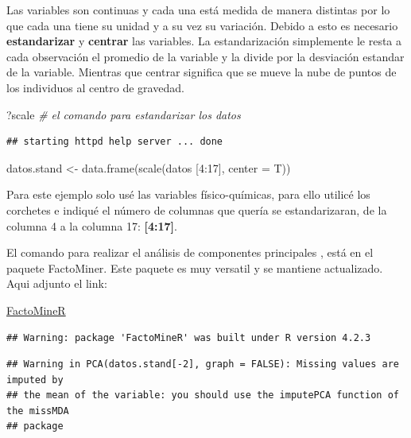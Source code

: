 \documentclass[
]{book}
\newenvironment{Shaded}{\begin{snugshade}}{\end{snugshade}}
\newcommand{\AttributeTok}[1]{\textcolor[rgb]{0.77,0.63,0.00}{#1}}
\newcommand{\CommentTok}[1]{\textcolor[rgb]{0.56,0.35,0.01}{\textit{#1}}}
\newcommand{\DecValTok}[1]{\textcolor[rgb]{0.00,0.00,0.81}{#1}}
\newcommand{\FunctionTok}[1]{\textcolor[rgb]{0.00,0.00,0.00}{#1}}
\newcommand{\NormalTok}[1]{#1}
\newcommand{\OtherTok}[1]{\textcolor[rgb]{0.56,0.35,0.01}{#1}}
\newcommand{\SpecialCharTok}[1]{\textcolor[rgb]{0.00,0.00,0.00}{#1}}
\begin{document}
Las variables son continuas y cada una está medida de manera distintas por lo que cada una tiene su unidad y a su vez su variación. Debido a esto es necesario \textbf{estandarizar} y \textbf{centrar} las variables. La estandarización simplemente le resta a cada observación el promedio de la variable y la divide por la desviación estandar de la variable. Mientras que centrar significa que se mueve la nube de puntos de los individuos al centro de gravedad.

\begin{Shaded}
\begin{Highlighting}[]
\NormalTok{?scale }\CommentTok{\# el comando para estandarizar los datos}
\end{Highlighting}
\end{Shaded}

\begin{verbatim}
## starting httpd help server ... done
\end{verbatim}

\begin{Shaded}
\begin{Highlighting}[]
\NormalTok{datos.stand }\OtherTok{\textless{}{-}} \FunctionTok{data.frame}\NormalTok{(}\FunctionTok{scale}\NormalTok{(datos [}\DecValTok{4}\SpecialCharTok{:}\DecValTok{17}\NormalTok{], }\AttributeTok{center =}\NormalTok{ T))}
\end{Highlighting}
\end{Shaded}

Para este ejemplo solo usé las variables físico-químicas, para ello utilicé los corchetes e indiqué el número de columnas que quería se estandarizaran, de la columna 4 a la columna 17: \textbf{{[}4:17{]}}.

El comando para realizar el análisis de componentes principales , está en el paquete FactoMiner. Este paquete es muy versatil y se mantiene actualizado. Aqui adjunto el link:

\href{http://factominer.free.fr}{FactoMineR}

\begin{verbatim}
## Warning: package 'FactoMineR' was built under R version 4.2.3
\end{verbatim}

\begin{verbatim}
## Warning in PCA(datos.stand[-2], graph = FALSE): Missing values are imputed by
## the mean of the variable: you should use the imputePCA function of the missMDA
## package
\end{verbatim}
\end{document}
